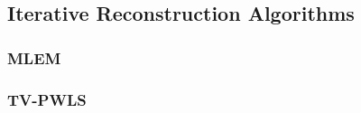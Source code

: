 \subsection{Iterative Reconstruction Algorithms}

\subsubsection{MLEM}

\subsubsection{TV-PWLS}












